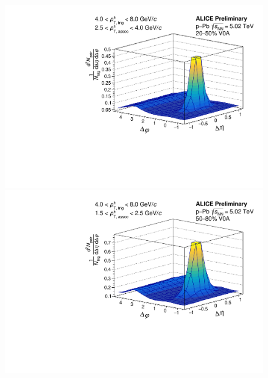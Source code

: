 \begin{figure}[ht]
\begin{minipage}{0.48\textwidth}
	\end{minipage}
	\begin{minipage}{0.48\textwidth}
		\includegraphics[width=\textwidth]{figures/analysis/h_h_2d_mixcor_fancy_label_20_50_highpt.pdf}
	\end{minipage}
	\begin{minipage}{0.48\textwidth}
		\includegraphics[width=\textwidth]{figures/analysis/h_h_2d_mixcor_fancy_label_50_80_lowpt.pdf}
	\end{minipage}
	\begin{minipage}{0.48\textwidth}

\end{minipage}
\end{figure}
